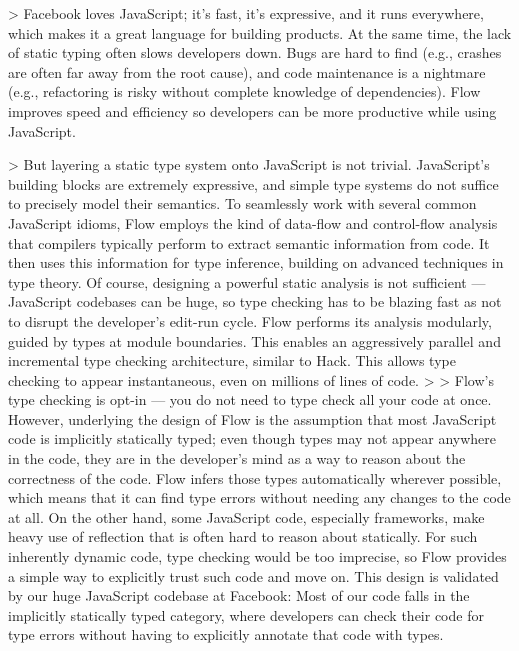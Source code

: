 
> Facebook loves JavaScript; it’s fast, it’s expressive, and it runs everywhere, which makes it a great language for building products. At the same time, the lack of static typing often slows developers down. Bugs are hard to find (e.g., crashes are often far away from the root cause), and code maintenance is a nightmare (e.g., refactoring is risky without complete knowledge of dependencies). Flow improves speed and efficiency so developers can be more productive while using JavaScript.

> But layering a static type system onto JavaScript is not trivial. JavaScript’s building blocks are extremely expressive, and simple type systems do not suffice to precisely model their semantics. To seamlessly work with several common JavaScript idioms, Flow employs the kind of data-flow and control-flow analysis that compilers typically perform to extract semantic information from code. It then uses this information for type inference, building on advanced techniques in type theory. Of course, designing a powerful static analysis is not sufficient — JavaScript codebases can be huge, so type checking has to be blazing fast as not to disrupt the developer’s edit-run cycle. Flow performs its analysis modularly, guided by types at module boundaries. This enables an aggressively parallel and incremental type checking architecture, similar to Hack. This allows type checking to appear instantaneous, even on millions of lines of code.
>
> Flow’s type checking is opt-in — you do not need to type check all your code at once. However, underlying the design of Flow is the assumption that most JavaScript code is implicitly statically typed; even though types may not appear anywhere in the code, they are in the developer’s mind as a way to reason about the correctness of the code. Flow infers those types automatically wherever possible, which means that it can find type errors without needing any changes to the code at all. On the other hand, some JavaScript code, especially frameworks, make heavy use of reflection that is often hard to reason about statically. For such inherently dynamic code, type checking would be too imprecise, so Flow provides a simple way to explicitly trust such code and move on. This design is validated by our huge JavaScript codebase at Facebook: Most of our code falls in the implicitly statically typed category, where developers can check their code for type errors without having to explicitly annotate that code with types.

